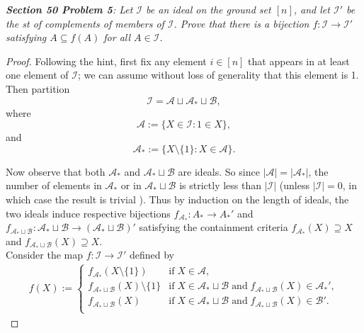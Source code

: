 \documentclass{article}
\begin{document}
\it \textbf{Section 50 Problem 5}: Let $\mathcal{I}$ be an ideal on the
  ground set $[n]$, and let $\mathcal{I}'$ be the st of complements of
  members of $\mathcal{I}$. Prove that there is a bijection
  $f:\mathcal{I}\rightarrow\mathcal{I}'$ satisfying $A\subseteq f(A)$ for
  all $A\in\mathcal{I}$.

  \begin{proof}
    Following the hint, first fix any element $i\in[n]$ that appears in at
    least one element of $\mathcal{I}$; we can assume without loss of
    generality that this element is 1. Then partition
    \[\mathcal{I}=\mathcal{A}\sqcup\mathcal{A}_*\sqcup\mathcal{B},\]
    where
    \[\mathcal{A} :=\{X\in\mathcal{I}: 1\in X\},\]
    and
    \[\mathcal{A}_* :=\{X\setminus\{1\}: X\in\mathcal{A}\}.\]

    Now observe that both $\mathcal{A}_*$ and
    $\mathcal{A}_*\sqcup\mathcal{B}$ are ideals. So since
    $|\mathcal{A}|=|\mathcal{A}_*|$, the number of elements in
    $\mathcal{A}_*$ or in $\mathcal{A}_*\sqcup\mathcal{B}$ is strictly less
    than $|\mathcal{I}|$ (unless $|\mathcal{I}|=0$, in which case the
    result is trivial ). Thus by induction on the length of ideals, the two
    ideals induce respective bijections $f_{\mathcal{A}_*}:A_*\rightarrow
    A_*'$ and $f_{\mathcal{A}_*\sqcup\mathcal{B}}:
    \mathcal{A}_*\sqcup\mathcal{B} \rightarrow
    (\mathcal{A}_*\sqcup\mathcal{B})'$ satisfying the
    containment criteria $f_{\mathcal{A}_*}(X)\supseteq X$ and
    $f_{\mathcal{A}_*\sqcup\mathcal{B}}(X)\supseteq X$. \\

    Consider the map $f:\mathcal{I}\rightarrow\mathcal{I}'$ defined by
    \begin{align*}
      f(X) :=
      \begin{cases}
        f_{\mathcal{A}_*}(X\setminus\{1\}) &\text{if}\; X\in \mathcal{A},\\
        f_{\mathcal{A}_*\sqcup\mathcal{B}}(X)\setminus\{1\} &\text{if}\; X\in
          \mathcal{A}_*\sqcup\mathcal{B}\; \text{and}\;
          f_{\mathcal{A}_*\sqcup\mathcal{B}}(X) \in\mathcal{A}_*',\\
        f_{\mathcal{A}_*\sqcup\mathcal{B}}(X) &\text{if}\; X\in
          \mathcal{A}_*\sqcup\mathcal{B}\; \text{and}\;
          f_{\mathcal{A}_*\sqcup\mathcal{B}}(X) \in\mathcal{B}'.\\
      \end{cases}
    \end{align*}


\end{proof}
\end{document}
